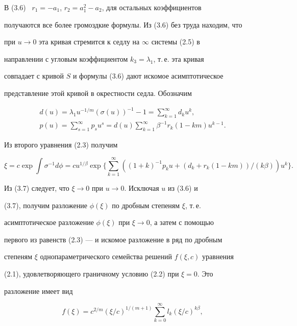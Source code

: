 В (3.6) \ $r_1=-a_1$, $r_2=a^2_1-a_2$, для остальных коэффициентов 


получаются все более громоздкие формулы. Из (3.6) без труда находим, что 


при $u\to0$ эта кривая стремится к седлу на $\infty$ системы (2.5) в 


направлении с угловым коэффициентом $k_3=\lambda_1$, т.\,е. эта кривая 


совпадает с кривой $S$ и формулы (3.6) дают искомое асимптотическое 


представление этой кривой в окрестности седла. Обозначим 


\begin{gather*} 


d(u)=\lambda_1u^{-1/m}(\sigma(u))^{-1}-1= 


\sum^\infty_{k=1}d_k u^k,\\ 


p(u)=\sum^\infty_{s=1}p_s u^s=d(u)\sum^\infty_{k=1} 


\beta^{-1}r_k(1-km)u^{k-1}. 


\end{gather*} 


Из второго уравнения (2.3) получим 


\begin{equation} 


\xi=c\exp\int\sigma^{-1}d\phi=c u^{1/\beta}\exp\bigg\{ 


\sum^\infty_{k=1}((1+k)^{-1}p_k u+(d_k+r_k(1-km))/ 


(k\beta))u^k\bigg\}. 


\end{equation} 


Из (3.7) следует, что $\xi\to0$ при $u\to0$. Исключая $u$ из (3.6) и 


(3.7), получим разложение $\phi(\xi)$ по дробным степеням $\xi$, т.\,е. 


асимптотическое разложение $\phi(\xi)$ при $\xi\to0$, а затем с помощью 


первого из равенств (2.3) --- и искомое разложение в ряд по дробным 


степеням $\xi$ однопараметрического семейства решений $f(\xi,c)$ уравнения 


(2.1), удовлетворяющего граничному условию (2.2) при $\xi=0$. Это 


разложение имеет вид 


\begin{equation} 


f(\xi)=c^{2/m}(\xi/c)^{1/(m+1)}\sum^\infty_{k=0}l_k 


(\xi/c)^{k\beta}, 


\end{equation} 


